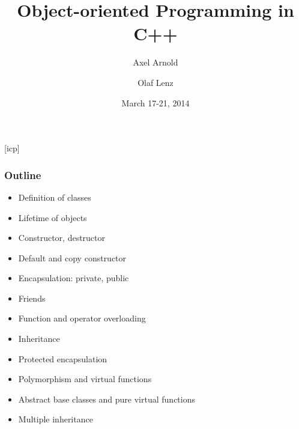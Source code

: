 \documentclass{slides}
\begin{document}
\graphicspath{{figures/}}

\title[Object-oriented Programming in C++]{\Large Object-oriented
  Programming in C++}

\author[A. Arnold and O. Lenz]{Axel Arnold \and Olaf Lenz} 
\date{March 17-21, 2014}

\begin{frame}
  \titlepage
\end {frame}
[icp]

\begin{frame}
  \frametitle{Outline}
  \begin{itemize}
  \item Definition of classes
  \item Lifetime of objects
  \item Constructor, destructor
  \item Default and copy constructor
  \item Encapsulation: private, public
  \item Friends
  \item Function and operator overloading
  \item Inheritance
  \item Protected encapsulation
  \item Polymorphism and virtual functions
  \item Abstract base classes and pure virtual functions
  \item Multiple inheritance
  \end{itemize}
\end{frame}
\end{document}
